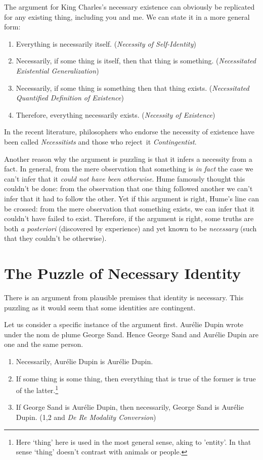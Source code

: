 \documentclass[../../../include/open-logic-chapter]{subfiles}
\begin{document}
The argument for King Charles's necessary existence can obviously be
replicated for any existing thing, including you and me. We can state
it in a more general form:

\begin{enumerate}
    \item  Everything is necessarily itself. (\emph{Necessity of
    Self-Identity})
    \item Necessarily, if some thing is itself, then that thing is
    something. (\emph{Necessitated Existential Generalization})
    \item Necessarily, if some thing is something then that thing
    exists. (\emph{Necessitated Quantified Definition of Existence})
    \item Therefore, everything necessarily exists. (\emph{Necessity
    of Existence})
\end{enumerate}

In the recent literature, philosophers who endorse the necessity of
existence have been called \emph{Necessitists} and those who reject\
it \emph{Contingentist}.

Another reason why the argument is puzzling is that it infers a
necessity from a fact. In general, from the mere observation that
something is \emph{in fact} the case we can't infer that it
\emph{could not have been otherwise}. Hume famously thought this
couldn't be done: from the observation that one thing followed another
we can't infer that it had to follow the other. Yet if this argument
is right, Hume's line can be crossed: from the mere observation that
something exists, we can infer that it couldn't have failed to exist.
Therefore, if the argument is right, some truths are both \emph{a
posteriori} (discovered by  experience) and yet known to be
\emph{necessary} (such that they couldn't be otherwise). 

\section{The Puzzle of Necessary Identity}

There is an argument from plausible premises that identity is
necessary. This puzzling as it would seem that some identities are
contingent. 

Let us consider a specific instance of the argument first. Aurélie
Dupin wrote under the nom de plume George Sand. Hence George Sand and
Aurélie Dupin are one and the same person.

\begin{enumerate}
\item Necessarily, Aurélie Dupin is Aurélie Dupin.
\item If some thing is some thing, then everything that is true of the
former is true of the latter.\footnote{Here `thing' here is used in
the most general sense, aking to 'entity'. In that sense `thing'
doesn't contrast with animals or people.}
\item If George Sand is Aurélie Dupin, then necessarily, George Sand is Aurélie Dupin. (1,2 and \emph{De Re Modality Conversion})
\end{enumerate}
\end{document}
